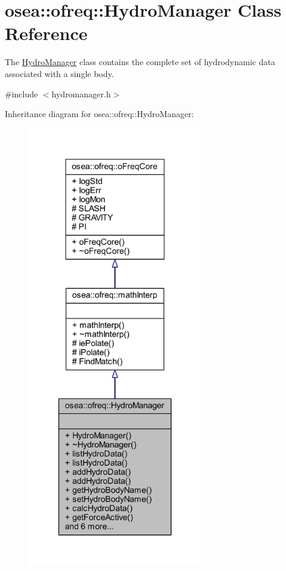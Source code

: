 \hypertarget{classosea_1_1ofreq_1_1_hydro_manager}{\section{osea\-:\-:ofreq\-:\-:Hydro\-Manager Class Reference}
\label{classosea_1_1ofreq_1_1_hydro_manager}
}


The \hyperlink{classosea_1_1ofreq_1_1_hydro_manager}{Hydro\-Manager} class contains the complete set of hydrodynamic data associated with a single body.  




{\ttfamily \#include $<$hydromanager.\-h$>$}



Inheritance diagram for osea\-:\-:ofreq\-:\-:Hydro\-Manager\-:
\nopagebreak
\begin{figure}[H]
\begin{center}
\leavevmode
\includegraphics[height=550pt]{classosea_1_1ofreq_1_1_hydro_manager__inherit__graph}
\end{center}
\end{figure}
